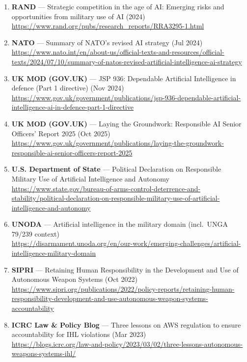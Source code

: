 \documentclass[
]{article}
\begin{document}
\begin{enumerate}
  \url{https://www.rand.org/pubs/research_reports/RRA4316-1.html}
\item
  \textbf{RAND} --- Strategic competition in the age of AI: Emerging
  risks and opportunities from military use of AI (2024)\\
  \url{https://www.rand.org/pubs/research_reports/RRA3295-1.html}
\item
  \textbf{NATO} --- Summary of NATO's revised AI strategy (Jul 2024)\\
  \url{https://www.nato.int/en/about-us/official-texts-and-resources/official-texts/2024/07/10/summary-of-natos-revised-artificial-intelligence-ai-strategy}
\item
  \textbf{UK MOD (GOV.UK)} --- JSP 936: Dependable Artificial
  Intelligence in defence (Part 1 directive) (Nov 2024)\\
  \url{https://www.gov.uk/government/publications/jsp-936-dependable-artificial-intelligence-ai-in-defence-part-1-directive}
\item
  \textbf{UK MOD (GOV.UK)} --- Laying the Groundwork: Responsible AI
  Senior Officers' Report 2025 (Oct 2025)\\
  \url{https://www.gov.uk/government/publications/laying-the-groundwork-responsible-ai-senior-officers-report-2025}
\item
  \textbf{U.S. Department of State} --- Political Declaration on
  Responsible Military Use of Artificial Intelligence and Autonomy\\
  \url{https://www.state.gov/bureau-of-arms-control-deterrence-and-stability/political-declaration-on-responsible-military-use-of-artificial-intelligence-and-autonomy}
\item
  \textbf{UNODA} --- Artificial intelligence in the military domain
  (incl.~UNGA 79/239 context)\\
  \url{https://disarmament.unoda.org/en/our-work/emerging-challenges/artificial-intelligence-military-domain}
\item
  \textbf{SIPRI} --- Retaining Human Responsibility in the Development
  and Use of Autonomous Weapon Systems (Oct 2022)\\
  \url{https://www.sipri.org/publications/2022/policy-reports/retaining-human-responsibility-development-and-use-autonomous-weapon-systems-accountability}
\item
  \textbf{ICRC Law \& Policy Blog} --- Three lessons on AWS regulation
  to ensure accountability for IHL violations (Mar 2023)\\
  \url{https://blogs.icrc.org/law-and-policy/2023/03/02/three-lessons-autonomous-weapons-systems-ihl/}

\end{enumerate}
\end{document}
